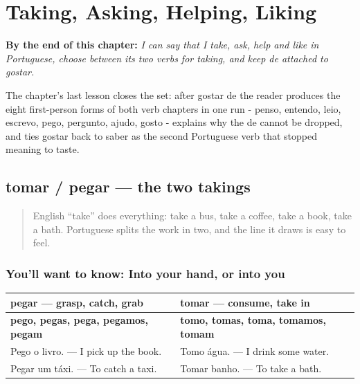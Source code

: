 
\chapter{Taking, Asking, Helping, Liking}
\label{ch:pt-taking-asking-helping-liking}

\begin{chapteropening}
\textbf{By the end of this chapter:} \emph{I can say that I take, ask, help and like in Portuguese, choose between its two verbs for taking, and keep de attached to gostar.}

The chapter's last lesson closes the set: after gostar de the reader produces the eight first-person forms of both verb chapters in one run - penso, entendo, leio, escrevo, pego, pergunto, ajudo, gosto - explains why the de cannot be dropped, and ties gostar back to saber as the second Portuguese verb that stopped meaning to taste.
\end{chapteropening}

\section[tomar / pegar]{tomar / pegar — the two takings}

\label{lesson:PT-C20-tomar-pegar}



\begin{quote}
English \textquotedblleft{}take\textquotedblright{} does everything: take a bus, take a coffee, take a book, take a bath. Portuguese splits the work in two, and the line it draws is easy to feel.
\end{quote}

\subsection*{You'll want to know: Into your hand, or into you}
\noindent
\begin{tabularx}{\linewidth}{@{}>{\raggedright\arraybackslash}X>{\raggedright\arraybackslash}X@{}}
\toprule
\textbf{pegar — grasp, catch, grab} & \textbf{tomar — consume, take in} \\
\midrule
\textbf{pego, pegas, pega, pegamos, pegam} & \textbf{tomo, tomas, toma, tomamos, tomam} \\
Pego o livro. — I pick up the book. & Tomo água. — I drink some water. \\
Pegar um táxi. — To catch a taxi. & Tomar banho. — To take a bath. \\
\bottomrule
\end{tabularx}

